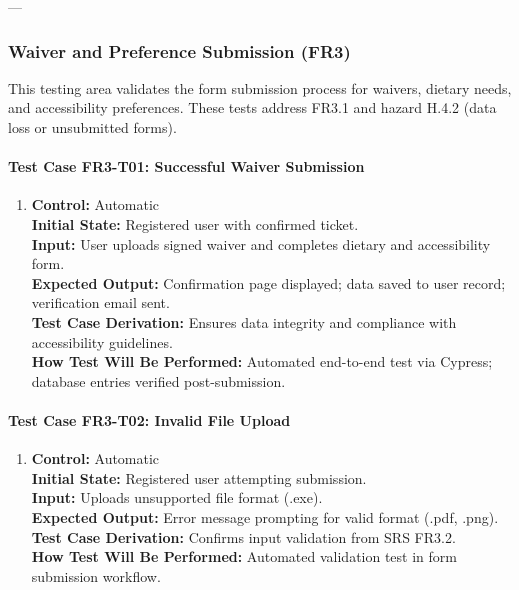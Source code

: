 \documentclass[12pt, titlepage]{article}
\begin{document}
---

\subsubsection{Waiver and Preference Submission (FR3)}

This testing area validates the form submission process for waivers, dietary needs, and accessibility preferences. These tests address FR3.1 and hazard H.4.2 (data loss or unsubmitted forms).

\paragraph{Test Case FR3-T01: Successful Waiver Submission}

\begin{enumerate}
    \item \textbf{Control:} Automatic\\
    \textbf{Initial State:} Registered user with confirmed ticket.\\
    \textbf{Input:} User uploads signed waiver and completes dietary and accessibility form.\\
    \textbf{Expected Output:} Confirmation page displayed; data saved to user record; verification email sent.\\
    \textbf{Test Case Derivation:} Ensures data integrity and compliance with accessibility guidelines.\\
    \textbf{How Test Will Be Performed:} Automated end-to-end test via Cypress; database entries verified post-submission.
\end{enumerate}

\paragraph{Test Case FR3-T02: Invalid File Upload}

\begin{enumerate}
    \item \textbf{Control:} Automatic\\
    \textbf{Initial State:} Registered user attempting submission.\\
    \textbf{Input:} Uploads unsupported file format (.exe).\\
    \textbf{Expected Output:} Error message prompting for valid format (.pdf, .png).\\
    \textbf{Test Case Derivation:} Confirms input validation from SRS FR3.2.\\
    \textbf{How Test Will Be Performed:} Automated validation test in form submission workflow.
\end{enumerate}
\end{document}
